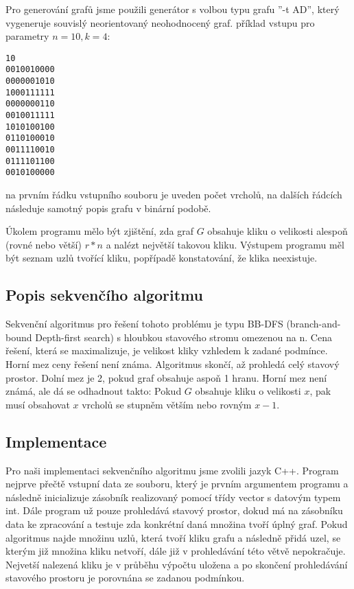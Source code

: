 \documentclass[12pt]{article}
\begin{document}
Pro generování grafů jsme použili generátor s volbou typu grafu ''-t AD'', 
který vygeneruje souvislý neorientovaný neohodnocený graf. příklad vstupu pro parametry $n = 10, k = 4$: 

\begin{verbatim}
10
0010010000
0000001010
1000111111
0000000110
0010011111
1010100100
0110100010
0011110010
0111101100
0010100000
\end{verbatim}

na prvním řádku vstupního souboru je uveden počet vrcholů, na dalších řádcích následuje samotný popis grafu v binární podobě.

Úkolem programu mělo být zjištění, zda graf $G$ obsahuje kliku o velikosti alespoň (rovné nebo větší) $r * n$ a nalézt největší takovou kliku. 
Výstupem programu měl být seznam uzlů tvořící kliku, popřípadě konstatování, že klika neexistuje. 


\subsection{Popis sekvenčího algoritmu}

Sekvenční algoritmus pro řešení tohoto problému je typu BB-DFS (branch-and-bound Depth-first search) 
s hloubkou stavového stromu omezenou na n. 
Cena řešení, která se maximalizuje, je velikost kliky vzhledem k zadané podmínce. 
Horní mez ceny řešení není známa. Algoritmus skončí, až prohledá celý stavový prostor.
Dolní mez je 2, pokud graf obsahuje aspoň 1 hranu.
Horní mez není známá, ale dá se odhadnout takto: Pokud $G$ obsahuje kliku o velikosti $x$, pak musí obsahovat $x$ vrcholů se stupněm větším nebo rovným $x-1$.

\subsection{Implementace}

Pro naši implementaci sekvenčního algoritmu jsme zvolili jazyk C++.
Program nejprve přečtě vstupní data ze souboru, který je prvním argumentem programu a následně inicializuje zásobník 
realizovaný pomocí třídy vector s datovým typem int.
Dále program už pouze prohledává stavový prostor, dokud má na zásobníku data ke zpracování
a testuje zda konkrétní daná množina tvoří úplný graf. 
Pokud algoritmus najde množinu uzlů, která tvoří kliku grafu a následně přidá uzel, se kterým již množina kliku netvoří, dále již v prohledávání této větvě nepokračuje.
Nejvetší nalezená kliku je v průběhu výpočtu uložena a po skončení prohledávání stavového prostoru je porovnána se zadanou podmínkou.
\end{document}
